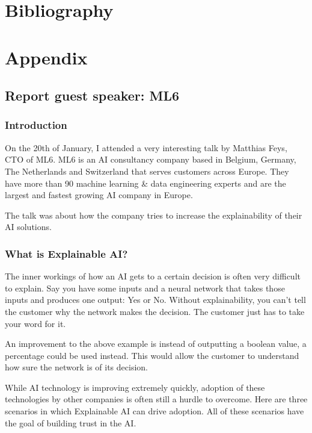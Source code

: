 \documentclass{article}
\begin{document}
\newpage
\section{Bibliography}
\renewcommand{\bibname}{}
\printbibliography[heading=none]

\newpage
\section{Appendix}

\subsection{Report guest speaker: ML6}

\subsubsection{Introduction}

On the 20th of January, I attended a very interesting talk by Matthias Feys, 
CTO of ML6. ML6 is an AI consultancy company based in Belgium, Germany, The Netherlands 
and Switzerland that serves customers across Europe. They have more than 90 
machine learning \& data engineering experts and are the largest and fastest 
growing AI company in Europe. 

The talk was about how the company tries to increase the explainability of their AI 
solutions. 

\subsubsection{What is Explainable AI?}

The inner workings of how an AI gets to a certain decision is often very difficult to explain.
Say you have some inputs and a neural network that takes those inputs and produces
one output: Yes or No. Without explainability, you can't tell the customer why the 
network makes the decision. The customer just has to take your word for it.

An improvement to the above example is instead of outputting a boolean value, 
a percentage could be used instead. This would allow the customer to understand
how sure the network is of its decision.

While AI technology is improving extremely quickly, adoption of these technologies
by other companies is often still a hurdle to overcome. Here are three scenarios in 
which Explainable AI can drive adoption. All of these scenarios have the goal of
building trust in the AI.
\end{document}
